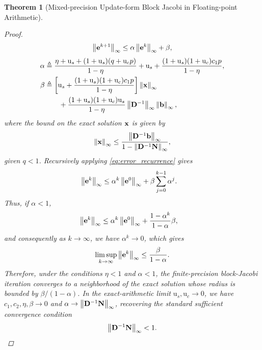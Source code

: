 \documentclass[11pt,draft]{article}
\newcommand{\urd}{\ensuremath{\mathrm{u}}}
\newcommand{\define}{\ensuremath{\triangleq}}
\newcommand{\vect}[1]{\mathbf{\MakeLowercase{#1}}}
\newcommand{\mat}[1]{\mathbf{\MakeUppercase{#1}}}
\newcommand{\norm}[2][]{\left\|#2\right\|_{#1}}
\newtheorem{theorem}{Theorem}[section]
\theoremstyle{definition}
\theoremstyle{remark}
\begin{document}
\begin{theorem}[Mixed-precision Update-form Block Jacobi in Floating-point Arithmetic]
\begin{proof}
\begin{align}
    \norm[\infty]{\vect{e}^{k+1}} \leq \alpha \norm[\infty]{\vect{e}^k} +\beta,
    \label{eq:error_recurrence}
\end{align}
\begin{align}
    \alpha &\define \frac{ \eta+\urd_s +(1+\urd_s)(q+\urd_c p) }{1-\eta} +\urd_s + \frac{ (1+\urd_s)(1+\urd_c)c_1p }{1-\eta}, \label{eq:alpha} \\
    \beta &\define \left[ \urd_s + \frac{ (1+\urd_s)(1+\urd_c)c_1p }{1-\eta} \right] \norm[\infty]{\vect{x}} \nonumber\\ &\qquad + \frac{ (1+\urd_s)(1+\urd_c)\urd_s }{1-\eta} \norm[\infty]{\mat{d}^{-1}} \norm[\infty]{\vect{b}}, \label{eq:beta}
\end{align}
where the bound on the exact solution $\vect{x}$ is given by
\begin{align}
    \norm[\infty]{\vect{x}} \leq \frac{\norm[\infty]{\mat{d}^{-1}\vect{b}}}{1 - \norm[\infty]{\mat{d}^{-1}\mat{n}}},
\end{align}
given $q < 1$.
Recursively applying \eqref{eq:error_recurrence} gives
\begin{align}
    \norm[\infty]{\vect{e}^{k}} &\leq \alpha^k\norm[\infty]{\vect{e}^{0}} + \beta\sum_{j=0}^{k-1}\alpha^j.
\end{align}
Thus, if $\alpha<1$,
\begin{align}
    \norm[\infty]{\vect{e}^{k}} &\leq \alpha^k\norm[\infty]{\vect{e}^{0}} + \frac{1-\alpha^k}{1-\alpha}\beta,
\end{align}
and consequently as $k\rightarrow\infty$, we have $\alpha^k\rightarrow 0$, which gives
\begin{align}
    \limsup_{k\rightarrow\infty} \norm[\infty]{\vect{e}^{k}} \leq \frac{\beta}{1-\alpha}.
\end{align}
Therefore, under the conditions $\eta<1$ and $\alpha<1$, the finite-precision block-Jacobi iteration converges to a neighborhood of the exact solution whose radius is bounded by $\beta/(1-\alpha)$. In the exact-arithmetic limit $\urd_s,\urd_c\rightarrow0$, we have $c_1,c_2,\eta,\beta\rightarrow0$ and $\alpha\rightarrow\norm[\infty]{\mat{d}^{-1}\mat{n}}$, recovering the standard sufficient convergence condition
\begin{align}
    \norm[\infty]{\mat{d}^{-1}\mat{n}}<1.
\end{align}

\end{proof}
\end{theorem}
\end{document}
